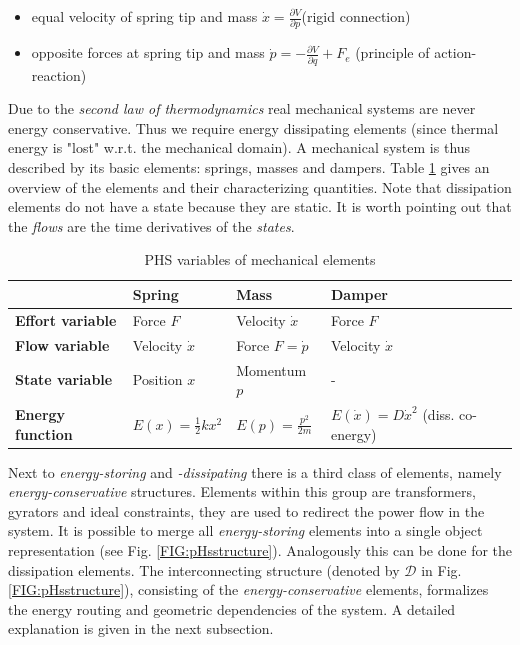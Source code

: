 \documentclass[a4paper,twoside, openright,12pt]{report}
\begin{document}
\begin{itemize}
\itemsep0em
	\item equal velocity of spring tip and mass $\dot{x}=\frac{\partial V}{\partial p}$(rigid connection)
	\item opposite forces at spring tip and mass $\dot{p}=-\frac{\partial V}{\partial q}+F_e$ (principle of action-reaction) 
\end{itemize}
Due to the \emph{second law of thermodynamics} real mechanical systems are never energy conservative. Thus we require energy dissipating elements (since thermal energy is "lost" w.r.t. the mechanical domain). A mechanical system is thus described by its basic elements: springs, masses and dampers. Table \ref{TAB:PHSvar_mechanic} gives an overview of the elements and their characterizing quantities. Note that dissipation elements do not have a state because they are static. It is worth pointing out that the \emph{flows} are the time derivatives of the \emph{states}.    



\begin{table}
	\centering
	\caption[PHS variables of mechanical elements]{PHS variables of mechanical elements}
	\label{TAB:PHSvar_mechanic}
	
	\begin{tabular}{ l | l | l | l }
		& \textbf{Spring} & \textbf{Mass} & \textbf{Damper} \\ \hline
		\textbf{Effort variable} & Force $F$ & Velocity $\dot{x}$ & Force $ F $ \\ \hline
		\textbf{Flow variable} & Velocity $ \dot{x} $ & Force $ F = \dot{p} $ & Velocity $ \dot{x} $ \\ \hline
		\textbf{State variable} & Position $x$ & Momentum $ p $ & - \\ \hline
		\textbf{Energy function} & $ E(x) = \frac{1}{2}kx^2 $ & $ E(p) = \frac{p^2}{2m} $ & $E(\dot{x}) = D\dot{x}^2  $ (diss. co-energy) \\ 
	\end{tabular}
\end{table}

Next to \emph{energy-storing} and \emph{-dissipating} there is a third class of elements, namely \emph{energy-conservative} structures. Elements within this group are transformers, gyrators and ideal constraints, they are used to redirect the power flow in the system. It is possible to merge all \emph{energy-storing} elements into a single object representation (see Fig. \ref{FIG:pHsstructure}). Analogously this can be done for the dissipation elements. The interconnecting structure (denoted by $\mathcal{D}$ in Fig. \ref{FIG:pHsstructure}), consisting of the \emph{energy-conservative} elements, formalizes the energy routing and geometric dependencies of the system. A detailed explanation is given in the next subsection.
\end{document}
